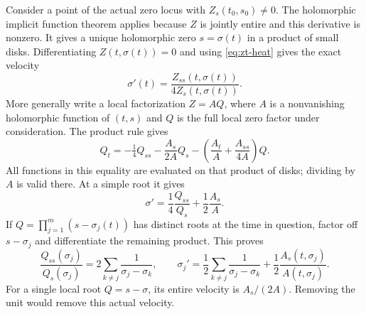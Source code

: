 Consider a point of the actual zero locus with $Z_s(t_0,s_0)\ne0$.
The holomorphic implicit function theorem applies because $Z$ is
jointly entire and this derivative is nonzero.  It gives a unique
holomorphic zero $s=\sigma(t)$ in a product of small disks.
Differentiating $Z(t,\sigma(t))=0$ and using
\eqref{eq:zt-heat} gives the exact velocity
\begin{equation}
 \sigma'(t)=\frac{Z_{ss}(t,\sigma(t))}{4Z_s(t,\sigma(t))}.
 \label{eq:zt-simple-base}
\end{equation}
More generally write a local factorization $Z=AQ$, where $A$ is a
nonvanishing holomorphic function of $(t,s)$ and $Q$ is the full
local zero factor under consideration.  The product rule gives
\begin{equation}
 Q_t=-\tfrac14Q_{ss}-\frac{A_s}{2A}Q_s
             -\left(\frac{A_t}{A}+\frac{A_{ss}}{4A}\right)Q.
 \label{eq:zt-unit-pde}
\end{equation}
All functions in this equality are evaluated on that product of
disks; dividing by $A$ is valid there.  At a simple root it gives
\begin{equation}
 \sigma'=\frac14\frac{Q_{ss}}{Q_s}
                      +\frac12\frac{A_s}{A}.
 \label{eq:zt-unit-velocity}
\end{equation}
If $Q=\prod_{j=1}^m(s-\sigma_j(t))$ has distinct roots at the time
in question, factor off $s-\sigma_j$ and differentiate the remaining
product.  This proves
\[
 \frac{Q_{ss}(\sigma_j)}{Q_s(\sigma_j)}
       =2\sum_{k\ne j}\frac1{\sigma_j-\sigma_k},\qquad
 \sigma_j'=\frac12\sum_{k\ne j}\frac1{\sigma_j-\sigma_k}
                    +\frac12\frac{A_s(t,\sigma_j)}{A(t,\sigma_j)}.
\]
For a single local root $Q=s-\sigma$, its entire velocity is
$A_s/(2A)$.  Removing the unit would remove this actual velocity.

